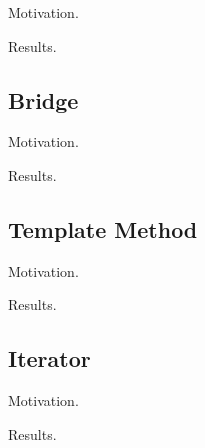   Motivation. 

  \begin{definition}[]
    
  \end{definition}

  Results. 

  \begin{example}
    
  \end{example}

\subsection{Bridge}

  Motivation. 

  \begin{definition}[]
    
  \end{definition}

  Results. 

  \begin{example}
    
  \end{example}

\subsection{Template Method}

  Motivation. 

  \begin{definition}[]
    
  \end{definition}

  Results. 

  \begin{example}
    
  \end{example}

\subsection{Iterator}

  Motivation. 

  \begin{definition}[]
    
  \end{definition}

  Results. 

  \begin{example}
    
  \end{example}

